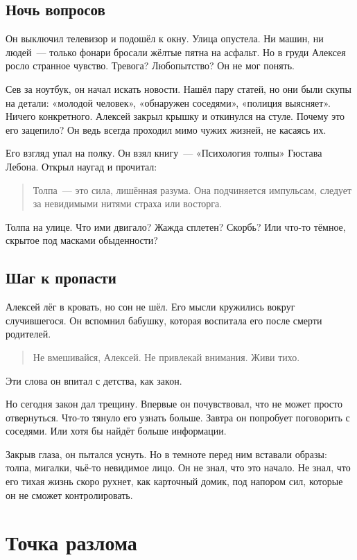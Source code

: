 \documentclass[12pt,a4paper]{book}
\begin{document}
\section{Ночь вопросов}

Он выключил телевизор и подошёл к окну. Улица опустела. Ни машин, ни людей~--- только фонари бросали жёлтые пятна на асфальт. Но в груди Алексея росло странное чувство. Тревога? Любопытство? Он не мог понять.

Сев за ноутбук, он начал искать новости. Нашёл пару статей, но они были скупы на детали: «молодой человек», «обнаружен соседями», «полиция выясняет». Ничего конкретного. Алексей закрыл крышку и откинулся на стуле. Почему это его зацепило? Он ведь всегда проходил мимо чужих жизней, не касаясь их.

Его взгляд упал на полку. Он взял книгу~--- «Психология толпы» Гюстава Лебона. Открыл наугад и прочитал:
\begin{quote}
Толпа~--- это сила, лишённая разума. Она подчиняется импульсам, следует за невидимыми нитями страха или восторга.
\end{quote}

Толпа на улице. Что ими двигало? Жажда сплетен? Скорбь? Или что-то тёмное, скрытое под масками обыденности?

\section{Шаг к пропасти}

Алексей лёг в кровать, но сон не шёл. Его мысли кружились вокруг случившегося. Он вспомнил бабушку, которая воспитала его после смерти родителей.
\begin{quote}
Не вмешивайся, Алексей. Не привлекай внимания. Живи тихо.
\end{quote}
Эти слова он впитал с детства, как закон.

Но сегодня закон дал трещину. Впервые он почувствовал, что не может просто отвернуться. Что-то тянуло его узнать больше. Завтра он попробует поговорить с соседями. Или хотя бы найдёт больше информации.

Закрыв глаза, он пытался уснуть. Но в темноте перед ним вставали образы: толпа, мигалки, чьё-то невидимое лицо. Он не знал, что это начало. Не знал, что его тихая жизнь скоро рухнет, как карточный домик, под напором сил, которые он не сможет контролировать.

\chapter{Точка разлома}
\end{document}
